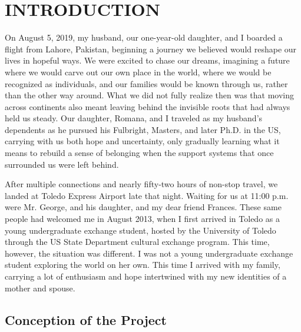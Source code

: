 \chapter{\texorpdfstring{INTRODUCTION}{}} %

\begin{epigraphs}
    

\end{epigraphs}


On August 5, 2019, my husband, our one-year-old daughter, and I boarded a flight from Lahore, Pakistan, beginning a journey we believed would reshape our lives in hopeful ways. We were excited to chase our dreams, imagining a future where we would carve out our own place in the world, where we would be recognized as individuals, and our families would be known through us, rather than the other way around. What we did not fully realize then was that moving across continents also meant leaving behind the invisible roots that had always held us steady. Our daughter, Romana, and I traveled as my husband’s dependents as he pursued his Fulbright, Masters, and later Ph.D. in the US, carrying with us both hope and uncertainty, only gradually learning what it means to rebuild a sense of belonging when the support systems that once surrounded us were left behind. 

After multiple connections and nearly fifty-two hours of non-stop travel, we landed at Toledo Express Airport late that night. Waiting for us at 11:00 p.m. were Mr. George, and his daughter, and my dear friend Frances. These same people had welcomed me in August 2013, when I first arrived in Toledo as a young undergraduate exchange student, hosted by the University of Toledo through the US State Department cultural exchange program. This time, however, the situation was different. I was not a young undergraduate exchange student exploring the world on her own. This time I arrived with my family, carrying a lot of enthusiasm and hope intertwined with my new identities of a mother and spouse.

\section{Conception of the Project}

